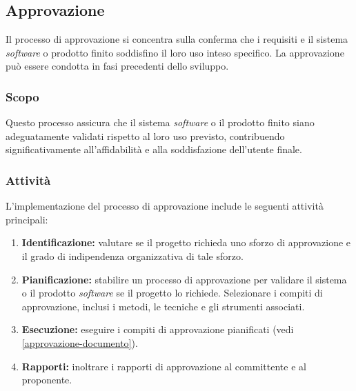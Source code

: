 \subsection{Approvazione}
\label{subsec:approvazione}

Il processo di approvazione si concentra sulla conferma che i requisiti e il
sistema \textit{software} o prodotto finito soddisfino il loro uso inteso
specifico. La approvazione può essere condotta in fasi precedenti dello sviluppo.

\subsubsection{Scopo}

Questo processo assicura che il sistema \textit{software} o il prodotto finito
siano adeguatamente validati rispetto al loro uso previsto, contribuendo
significativamente all'affidabilità e alla soddisfazione dell'utente finale.

\subsubsection{Attività}
L'implementazione del processo di approvazione include le seguenti attività
principali:

\begin{enumerate}
	\item \textbf{Identificazione:} valutare se il progetto richieda uno sforzo
	      di approvazione e il grado di indipendenza organizzativa di tale
	      sforzo.
	\item \textbf{Pianificazione:} stabilire un processo di approvazione per
	      validare il sistema o il prodotto \textit{software} se il progetto lo
	      richiede. Selezionare i compiti di approvazione, inclusi i metodi, le
	      tecniche e gli strumenti associati.
	\item \textbf{Esecuzione:} eseguire i compiti di approvazione pianificati
	      (vedi \cref{approvazione-documento}).
	\item \textbf{Rapporti:} inoltrare i rapporti di approvazione al committente
	      e al proponente.
\end{enumerate}
